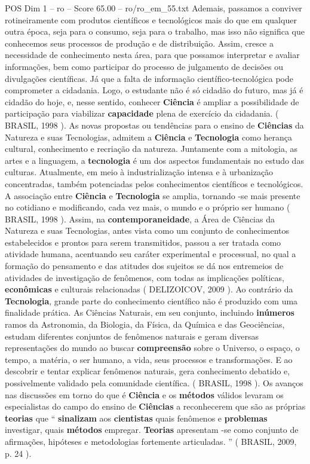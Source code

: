 \begin{textsample}{POS Dim 1 – ro – Score 65.00 – ro/ro\_em\_55.txt}
Ademais, passamos a conviver rotineiramente com produtos científicos e tecnológicos mais do que em qualquer outra época, seja para o consumo, seja para o trabalho, mas isso não significa que conhecemos seus processos de produção e de distribuição.
Assim, cresce a necessidade de conhecimento nesta área, para que possamos interpretar e avaliar informações, bem como participar do processo de julgamento de decisões ou divulgações científicas.
Já que a falta de informação científico-tecnológica pode comprometer a cidadania.
Logo, o estudante não é só cidadão do futuro, mas já é cidadão do hoje, e, nesse sentido, conhecer \textbf{Ciência} é ampliar a possibilidade de participação para viabilizar \textbf{capacidade} plena de exercício da cidadania. ( BRASIL, 1998 ).
As novas propostas ou tendências para o ensino de \textbf{Ciências} da Natureza e suas Tecnologias, admitem a \textbf{Ciência} e \textbf{Tecnologia} como herança cultural, conhecimento e recriação da natureza.
Juntamente com a mitologia, as artes e a linguagem, a \textbf{tecnologia} é um dos aspectos fundamentais no estudo das culturas.
Atualmente, em meio à industrialização intensa e à urbanização concentradas, também potenciadas pelos conhecimentos científicos e tecnológicos.
A associação entre \textbf{Ciência} e \textbf{Tecnologia} se amplia, tornando -se mais presente no cotidiano e modificando, cada vez mais, o mundo e o próprio ser humano ( BRASIL, 1998 ).
Assim, na \textbf{contemporaneidade}, a Área de Ciências da Natureza e suas Tecnologias, antes vista como um conjunto de conhecimentos estabelecidos e prontos para serem transmitidos, passou a ser tratada como atividade humana, acentuando seu caráter experimental e processual, no qual a formação do pensamento e das atitudes dos sujeitos se dá nos entremeios de atividades de investigação de fenômenos, com todas as implicações políticas, \textbf{econômicas} e culturais relacionadas ( DELIZOICOV, 2009 ).
Ao contrário da \textbf{Tecnologia}, grande parte do conhecimento científico não é produzido com uma finalidade prática.
As Ciências Naturais, em seu conjunto, incluindo \textbf{inúmeros} ramos da Astronomia, da Biologia, da Física, da Química e das Geociências, estudam diferentes conjuntos de fenômenos naturais e geram diversas representações do mundo ao buscar \textbf{compreensão} sobre o Universo, o espaço, o tempo, a matéria, o ser humano, a vida, seus processos e transformações.
E ao descobrir e tentar explicar fenômenos naturais, gera conhecimento debatido e, possivelmente validado pela comunidade científica. ( BRASIL, 1998 ).
Os avanços nas discussões em torno do que é \textbf{Ciência} e os \textbf{métodos} válidos levaram os especialistas do campo do ensino de \textbf{Ciências} a reconhecerem que são as próprias \textbf{teorias} que “ \textbf{sinalizam} aos \textbf{cientistas} quais fenômenos e \textbf{problemas} investigar, quais \textbf{métodos} empregar. \textbf{Teorias} apresentam -se como conjunto de afirmações, hipóteses e metodologias fortemente articuladas. ” ( BRASIL, 2009, p. 24 ).

\end{textsample}
